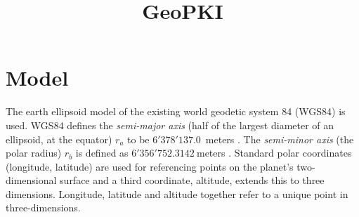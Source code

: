\documentclass[10pt,conference,compsocconf]{IEEEtran}
\title{\Large GeoPKI \vspace{-1.1em}}
\date{}
\begin{document}
\makeatletter
\@twocolumnfalse
\maketitle
\@twocolumntrue
\makeatother




\section{Model}
\label{sec:model}

The earth ellipsoid model of the existing world geodetic system 84 (WGS84) \cite{noauthor_nga_nodate} is used.
WGS84 defines the \emph{semi-major axis} (half of the largest diameter of an ellipsoid, at the equator) $r_a$ to be $6'378'137.0$~meters \cite{noauthor_nga_nodate}. The \emph{semi-minor axis} (the polar radius) $r_b$ is defined as $6'356'752.3142~$meters \cite{noauthor_nga_nodate}.
Standard polar coordinates (longitude, latitude) are used for referencing points on the planet's two-dimensional surface and a third coordinate, altitude, extends this to three dimensions.
Longitude, latitude and altitude together refer to a unique point in three-dimensions.
\end{document}
